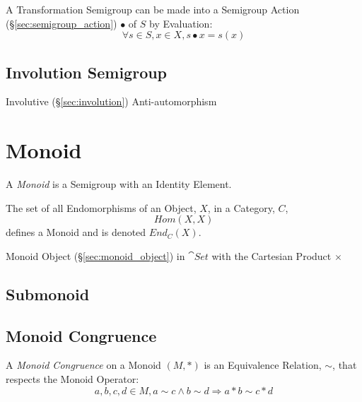 A Transformation Semigroup can be made into a Semigroup Action
(\S\ref{sec:semigroup_action}) $\bullet$ of $S$ by Evaluation:
\[
  \forall s \in S, x \in X, s \bullet x = s(x)
\]



\subsection{Involution Semigroup}\label{sec:involution_semigroup}

Involutive (\S\ref{sec:involution}) Anti-automorphism



\section{Monoid}\label{sec:monoid}

A \emph{Monoid} is a Semigroup with an Identity Element.

The set of all Endomorphisms of an Object, $X$, in a Category, $C$,
\[
    Hom(X,X)
\]
defines a Monoid and is denoted $End_C(X)$.

Monoid Object (\S\ref{sec:monoid_object}) in $\cat{Set}$ with the
Cartesian Product $\times$



\subsection{Submonoid}\label{sec:submonoid}

\subsection{Monoid Congruence}\label{sec:monoid_congruence}

A \emph{Monoid Congruence} on a Monoid $(M,*)$ is an Equivalence
Relation, $\sim$, that respects the Monoid Operator:
\[
  a,b,c,d \in M, a \sim c \wedge b \sim d \Rightarrow a*b \sim c*d
\]

